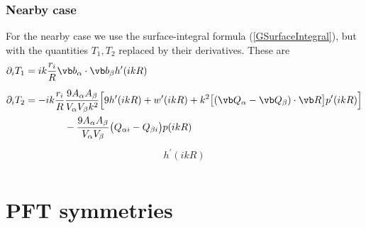 \documentclass[letterpaper]{article}
\begin{document}
\subsubsection*{Nearby case}
 
For the nearby case we use the surface-integral formula
(\ref{GSurfaceIntegral}), but with the quantities $T_1, T_2$ 
replaced by their derivatives. These are 
\begin{align*}
 \partial_i T_1 
&= 
 ik \frac{r_i}{R} \vb b_\alpha \cdot \vb b_\beta h^\prime(ikR)
\\[5pt]
 \partial_i T_2 
&= -ik\frac{r_i}{R}\frac{9A_\alpha A_\beta }{V_\alpha V_\beta k^2}
    \Big[  9h^\prime(ikR) 
          + w^\prime(ikR) 
          + k^2\big[(\vb Q_\alpha - \vb Q_\beta)\cdot \vb R\big]p^\prime(ikR)
    \Big]
\\
&\qquad \qquad 
   -\frac{9A_\alpha A_\beta}{V_\alpha V_\beta}
    \big( Q_{\alpha i}- Q_{\beta i} \big) p(ikR)
\end{align*}
\begin{align*}
 h^\prime(ikR) \\
\end{align*}

\newpage
\section{PFT symmetries}
\end{document}
